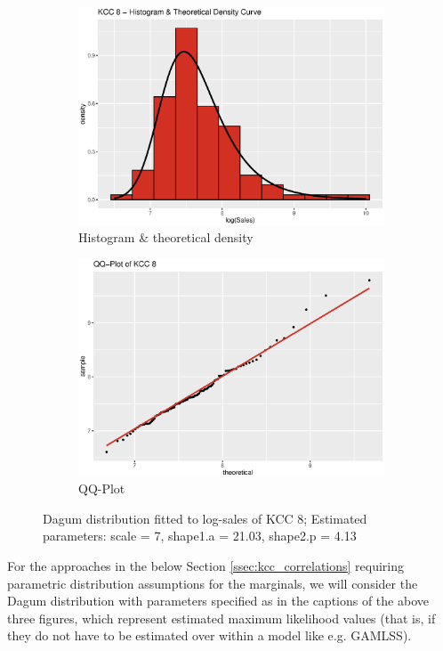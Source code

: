 \begin{figure}[H]
\centering
\begin{subfigure}{.45\textwidth}
  \centering
  \includegraphics[width=\linewidth]{figures/kcc_8_density.eps}
  \caption{Histogram \& theoretical density}
  \label{fig:kcc_8_density}
\end{subfigure}
\begin{subfigure}{.45\textwidth}
  \centering
  \includegraphics[width=\linewidth]{figures/kcc_8_qqplot.eps}
  \caption{QQ-Plot}
  \label{fig:kcc_8_qqplot}
\end{subfigure}
\caption{Dagum distribution fitted to log-sales of \ac{KCC} 8; Estimated parameters: scale = 7, shape1.a = 21.03, shape2.p = 4.13}
\label{fig:kcc_8_marginal}
\end{figure} 


For the approaches in the below Section \ref{ssec:kcc_correlations} requiring parametric distribution assumptions for the marginals, we will consider the Dagum distribution with parameters specified as in the captions of the above three figures, which represent estimated maximum likelihood values (that is, if they do not have to be estimated over within a model like e.g. \ac{GAMLSS}).



